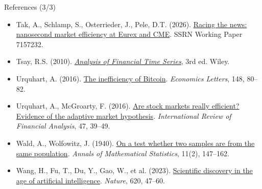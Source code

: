 \begin{frame}{References (3/3)}
\begin{itemize}
    \item Tak, A., Schlamp, S., Osterrieder, J., Pele, D.T. (2026). \href{https://doi.org/10.2139/ssrn.7157232}{Racing the news: nanosecond market efficiency at Eurex and CME}. SSRN Working Paper 7157232.
    \item Tsay, R.S. (2010). \href{https://doi.org/10.1002/9780470644560}{\textit{Analysis of Financial Time Series}}, 3rd ed. Wiley.
    \item Urquhart, A. (2016). \href{https://doi.org/10.1016/j.econlet.2016.09.019}{The inefficiency of Bitcoin}. \textit{Economics Letters}, 148, 80--82.
    \item Urquhart, A., McGroarty, F. (2016). \href{https://doi.org/10.1016/j.irfa.2016.06.011}{Are stock markets really efficient? Evidence of the adaptive market hypothesis}. \textit{International Review of Financial Analysis}, 47, 39--49.
    \item Wald, A., Wolfowitz, J. (1940). \href{https://doi.org/10.1214/aoms/1177731909}{On a test whether two samples are from the same population}. \textit{Annals of Mathematical Statistics}, 11(2), 147--162.
    \item Wang, H., Fu, T., Du, Y., Gao, W., et al. (2023). \href{https://doi.org/10.1038/s41586-023-06221-2}{Scientific discovery in the age of artificial intelligence}. \textit{Nature}, 620, 47--60.
\end{itemize}
\end{frame}


